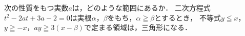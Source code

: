\documentclass[../../main.tex]{subfiles}
\begin{document}
次の性質をもつ実数$a$は，どのような範囲にあるか．
二次方程式$t^2-2at+3a-2=0$は実根$\alpha$，$\beta$をもち，$\alpha\geqq\beta$とするとき，
不等式$y \leqq x$，$y \geqq -x$，$ay\geqq3(x-\beta)$で定まる領域は，三角形になる．
\end{document}
